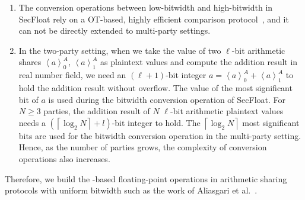\begin{enumerate}
    \item The conversion operations between low-bitwidth and high-bitwidth in SecFloat rely on a \twopc OT-based, highly efficient comparison protocol~\cite{rathee2020cryptflow2}, and it can not be directly extended to multi-party settings.
    \item In the two-party setting, when we take the value of two $\ell$-bit arithmetic shares $\left\langle a\right\rangle^A_0 $, $\left\langle a\right\rangle^A_1$ as plaintext values and compute the addition result in real number field, we need an $\left(\ell+1\right) $-bit integer $a =\left\langle a\right\rangle^A_0 +\left\langle a\right\rangle^A_1 $ to hold the addition result without overflow. The value of the most significant bit of $a$ is used during the bitwidth conversion operation of SecFloat. For $N\geq 3$ parties, the addition result of $N$ $\ell$-bit arithmetic plaintext values needs a $\left(\left\lceil \log_2{N}\right\rceil +l\right) $-bit integer to hold. The $\left\lceil \log_2{N}\right\rceil$ most significant bits are used for the bitwidth conversion operation in the multi-party setting. Hence, as the number of parties grows, the complexity of conversion operations also increases.
\end{enumerate}
Therefore, we build the \lsss-based floating-point operations in arithmetic sharing protocols with uniform bitwidth such as the work of Aliasgari et al.~\cite{aliasgari2012secure}.







